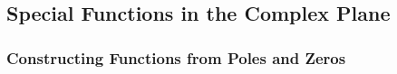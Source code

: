 









\subsection{Special Functions in the Complex Plane}

\subsubsection{Constructing Functions from Poles and Zeros}



